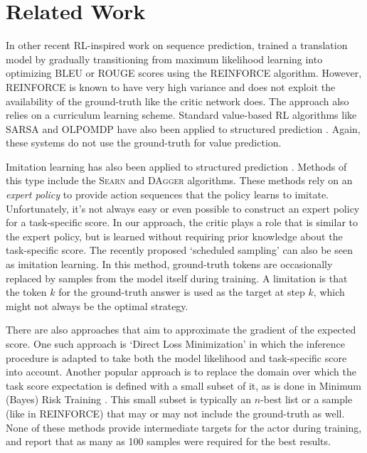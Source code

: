 \documentclass{article} %
\begin{document}
\section{Related Work}

In other recent RL-inspired work on sequence prediction, \citet{ranzato2015sequence}
trained a translation model 
by gradually transitioning from maximum likelihood learning into
optimizing BLEU or ROUGE scores using the REINFORCE algorithm.
However, REINFORCE is known to have very high variance
and does not exploit the availability of the ground-truth like the critic
network does. The approach also relies on a curriculum learning scheme.
Standard value-based RL algorithms like SARSA and OLPOMDP have also been applied to structured
prediction \citep{maes2009structured}. Again, these systems do not
use the ground-truth for value prediction.

Imitation learning has also been
applied to structured prediction \citep{vlachos2012investigation}.
Methods of this type include the \textsc{Searn} \citep{daume2009search}
and \textsc{DAgger} \citep{ross2010reduction} algorithms.
These methods rely on an 
\emph{expert policy} to provide action sequences that the policy
learns to imitate. Unfortunately, it's not always easy or even
possible to construct an expert policy for a task-specific score. 
In our approach, the critic plays a role that is similar to the
expert policy, but is learned without requiring
prior knowledge about the task-specific score.
The recently proposed `scheduled sampling'
\citep{bengio2015scheduled} can also be seen as imitation learning.
In this method, ground-truth tokens are occasionally replaced by
samples from the model itself during training. A limitation
is that the token $k$ for the ground-truth answer is used as the target at 
step $k$, which might not always be the optimal strategy.

There are also approaches that aim to approximate the gradient of the
expected score. One such approach is
`Direct Loss Minimization' \citep{hazan2010} in which the
inference procedure is adapted to take both the model likelihood and
task-specific score into account.
Another popular approach is to replace the domain over which the task score expectation is
defined with a small subset of it, as is done in Minimum (Bayes) Risk
Training \citep{goel2000minimum,shen2015minimum,och2003minimum}.
This small subset is typically an $n$-best list or a sample (like in REINFORCE) that may or may not include
the ground-truth as well.
None of these methods provide intermediate targets for the actor during
training, and \citet{shen2015minimum} report that as many as 100 samples
were required for the best results.
\end{document}

